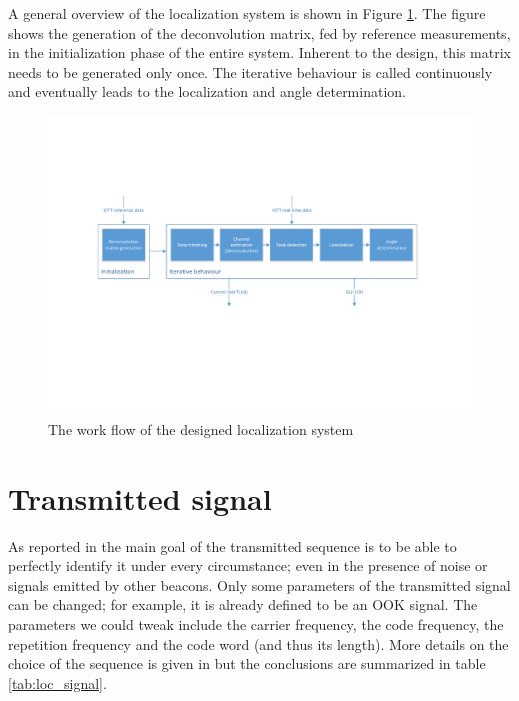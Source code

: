 \documentclass[11pt,titlepage]{report}
\begin{document}
A general overview of the localization system is shown in Figure \ref{fig:localization-overview}. The figure shows the generation of the deconvolution matrix, fed by reference measurements, in the initialization phase of the entire system. Inherent to the design, this matrix needs to be generated only once. The iterative behaviour is called continuously and eventually leads to the localization and angle determination.
\begin{figure}[H]
	\centering
	\includegraphics[width=\linewidth]{resource/localization-overview.pdf}
	\caption{The work flow of the designed localization system}
	\label{fig:localization-overview}
\end{figure}

\section{Transmitted signal}
\label{sec:loc_transmit}
As reported in \cite{epo4-del7} the main goal of the transmitted sequence is to be able to perfectly identify it under every circumstance; even in the presence of noise or signals emitted by other beacons. Only some parameters of the transmitted signal can be changed; for example, it is already defined to be an OOK signal. The parameters we could tweak include the carrier frequency, the code frequency, the repetition frequency and the code word (and thus its length). More details on the choice of the sequence is given in \cite{epo4-del7} but the conclusions are summarized in table \ref{tab:loc_signal}.
\end{document}
